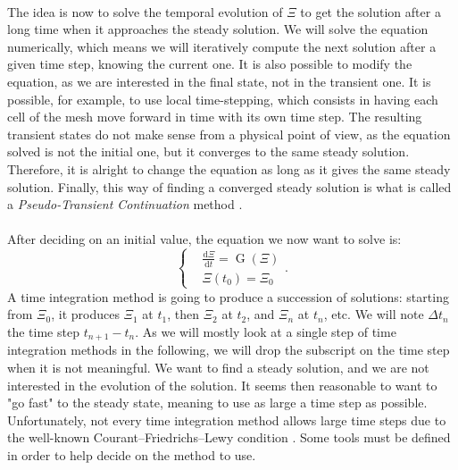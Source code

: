     \paragraph{}
    The idea is now to solve the temporal evolution of $\Xi$ to get the solution after a long time when it approaches the steady solution.
    We will solve the equation numerically, which means we will iteratively compute the next solution after a given time step, knowing the current one.
    It is also possible to modify the equation, as we are interested in the final state, not in the transient one.
    It is possible, for example, to use local time-stepping, which consists in having each cell of the mesh move forward in time with its own time step.
    The resulting transient states do not make sense from a physical point of view, as the equation solved is not the initial one, but it converges to the same steady solution.
    Therefore, it is alright to change the equation as long as it gives the same steady solution.
    Finally, this way of finding a converged steady solution is what is called a \emph{Pseudo-Transient Continuation} method \cite{KelleyKeyes1996}.

    \paragraph{}
    After deciding on an initial value, the equation we now want to solve is:
    \begin{equation}\label{eq:init_value_ode}
      \left\{\begin{aligned}
        & \frac{\mathrm{d} \Xi}{\mathrm{d}t} = \operatorname{G}\left(\Xi\right) \\
        & \Xi\left(t_0\right) = \Xi_0
      \end{aligned}\right. .
    \end{equation}
    A time integration method is going to produce a succession of solutions: starting from $\Xi_0$, it produces $\Xi_1$ at $t_1$, then $\Xi_2$ at $t_2$, and $\Xi_n$ at $t_n$, etc.
    We will note $\Delta t_n$ the time step $t_{n+1} - t_n$.
    As we will mostly look at a single step of time integration methods in the following, we will drop the subscript on the time step when it is not meaningful.
    We want to find a steady solution, and we are not interested in the evolution of the solution.
    It seems then reasonable to want to "go fast" to the steady state, meaning to use as large a time step as possible.
    Unfortunately, not every time integration method allows large time steps due to the well-known Courant--Friedrichs--Lewy condition \cite{CourantFriedrichsLewy1967}.
    Some tools must be defined in order to help decide on the method to use.


